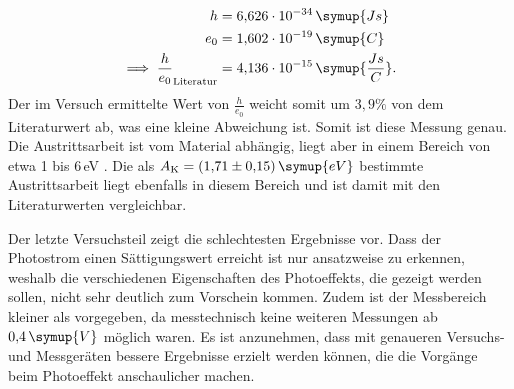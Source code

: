 \begin{equation*}
\begin{aligned}
h &= 6{,}626\cdot 10^{-34}\, \symup{Js} \\
e_0 &= 1{,}602 \cdot 10^{-19}\, \symup{C} \\
\implies \frac{h}{e_0}_{\text{Literatur}} &= 4{,}136 \cdot 10^{-15}\, \symup{\frac{Js}{C}}.
\end{aligned}
\end{equation*}
Der im Versuch ermittelte Wert von $\frac{h}{e_0}$ weicht somit um $3{,}9\%$ von dem Literaturwert ab, was eine kleine Abweichung ist. Somit ist diese Messung genau. 
Die Austrittsarbeit ist vom Material abhängig, liegt aber in einem Bereich von etwa 1 bis 6\,eV \cite{austrittsarbeit}. Die als $A_{\text{K}}= (1{,}71 \pm 0{,}15)\, \symup{eV}$ bestimmte Austrittsarbeit liegt ebenfalls in diesem Bereich und ist damit
mit den Literaturwerten vergleichbar.


Der letzte Versuchsteil zeigt die schlechtesten Ergebnisse vor. Dass der Photostrom einen Sättigungswert erreicht ist nur ansatzweise zu erkennen, weshalb die verschiedenen Eigenschaften des Photoeffekts, die gezeigt werden sollen, nicht sehr deutlich 
zum Vorschein kommen. Zudem ist der Messbereich kleiner als vorgegeben, da messtechnisch keine weiteren Messungen ab $0{,}4\,\symup{V}$ möglich waren. Es ist anzunehmen, dass mit genaueren Versuchs- und Messgeräten bessere Ergebnisse erzielt werden können,
die die Vorgänge beim Photoeffekt anschaulicher machen.
